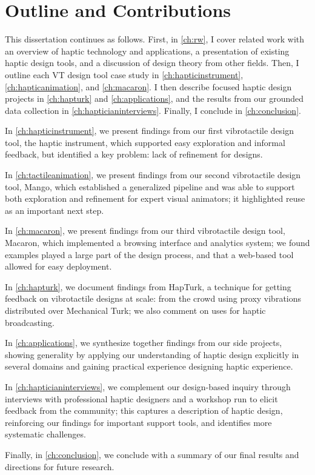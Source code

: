\section{Outline and Contributions}
This dissertation continues as follows.
First, in \autoref{ch:rw}, I cover related work with an overview of haptic technology and applications, a presentation of existing haptic design tools, and a discussion of design theory from other fields.
Then, I outline each VT design tool case study in \autoref{ch:hapticinstrument},  \autoref{ch:hapticanimation}, and \autoref{ch:macaron}.
I then describe focused haptic design projects in \autoref{ch:hapturk} and \autoref{ch:applications}, and the results from our grounded data collection in \autoref{ch:hapticianinterviews}.
Finally, I conclude in \autoref{ch:conclusion}.

In \autoref{ch:hapticinstrument}, we present findings from our first vibrotactile design tool, the haptic instrument, which supported easy exploration and informal feedback, but identified a key problem: lack of refinement for designs.

In \autoref{ch:tactileanimation}, we present findings from our second vibrotactile design tool, Mango, which established a generalized pipeline and was able to support both exploration and refinement for expert visual animators; it highlighted reuse as an important next step.

In \autoref{ch:macaron}, we present findings from our third vibrotactile design tool, Macaron, which implemented a browsing interface and analytics system; we found examples played a large part of the design process, and that a web-based tool allowed for easy deployment.

In \autoref{ch:hapturk}, we document findings from HapTurk, a technique for getting feedback on vibrotactile designs at scale: from the crowd using proxy vibrations distributed over Mechanical Turk; we also comment on uses for haptic broadcasting.

In \autoref{ch:applications}, we synthesize together findings from our side projects, showing generality by applying our understanding of haptic design explicitly in several domains and gaining practical experience designing haptic experience.

In \autoref{ch:hapticianinterviews}, we complement our design-based inquiry through interviews with professional haptic designers and a workshop run to elicit feedback from the community; this captures a description of haptic design, reinforcing our findings for important support tools, and identifies more systematic challenges.

Finally, in \autoref{ch:conclusion}, we conclude with a summary of our final results and directions for future research.


%
%
\endinput

Any text after an \endinput is ignored.
You could put scraps here or things in progress.

